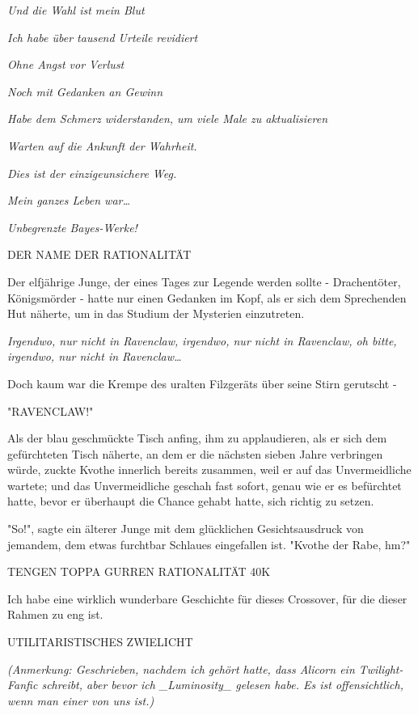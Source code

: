 {\emph{\emph{Und} \emph{die} \emph{Wahl ist mein Blut}}

\emph{\emph{Ich habe über tausend Urteile revidiert}}

\emph{\emph{Ohne Angst vor Verlust}}

\emph{\emph{Noch} \emph{mit Gedanken an} \emph{Gewinn}}

\emph{\emph{Habe dem Schmerz widerstanden, um viele Male zu aktualisieren}}

\emph{\emph{Warten auf die Ankunft der Wahrheit.}}

\emph{\emph{Dies ist der einzigeunsichere Weg.}}

\emph{\emph{Mein ganzes Leben war…}}

\emph{\emph{Unbegrenzte Bayes-Werke!}}

DER NAME DER RATIONALITÄT

Der elfjährige Junge, der eines Tages zur Legende werden sollte - Drachentöter, Königsmörder - hatte nur einen Gedanken im Kopf, als er sich dem Sprechenden Hut näherte, um in das Studium der Mysterien einzutreten.

\emph{\emph{Irgendwo, nur nicht in Ravenclaw, irgendwo, nur nicht in Ravenclaw, oh bitte, irgendwo, nur nicht in Ravenclaw…}}

Doch kaum war die Krempe des uralten Filzgeräts über seine Stirn gerutscht -

"RAVENCLAW!"

Als der blau geschmückte Tisch anfing, ihm zu applaudieren, als er sich dem gefürchteten Tisch näherte, an dem er die nächsten sieben Jahre verbringen würde, zuckte Kvothe innerlich bereits zusammen, weil er auf das Unvermeidliche wartete; und das Unvermeidliche geschah fast sofort, genau wie er es befürchtet hatte, bevor er überhaupt die Chance gehabt hatte, sich richtig zu setzen.

"So!", sagte ein älterer Junge mit dem glücklichen Gesichtsausdruck von jemandem, dem etwas furchtbar Schlaues eingefallen ist. "Kvothe der Rabe, hm?"

TENGEN TOPPA GURREN RATIONALITÄT 40K

Ich habe eine wirklich wunderbare Geschichte für dieses Crossover, für die dieser Rahmen zu eng ist.

UTILITARISTISCHES ZWIELICHT

\emph{\emph{(Anmerkung: Geschrieben, nachdem ich gehört hatte, dass} \emph{Alicorn} \emph{ein Twilight-Fanfic} \emph{schreibt, aber bevor ich \_Luminosity\_ gelesen habe. Es ist offensichtlich, wenn man einer von uns ist.)}}

}
